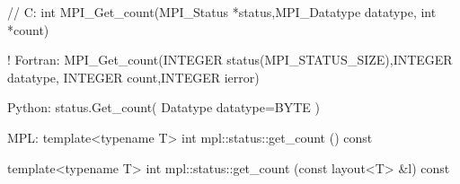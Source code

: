 // C:
int MPI_Get_count(MPI_Status *status,MPI_Datatype datatype,
    int *count)

! Fortran:
MPI_Get_count(INTEGER status(MPI_STATUS_SIZE),INTEGER datatype,
    INTEGER count,INTEGER ierror)

Python:
status.Get_count( Datatype datatype=BYTE )

MPL:
template<typename T>
int mpl::status::get_count () const
 
template<typename T>
int mpl::status::get_count (const layout<T> &l) const
